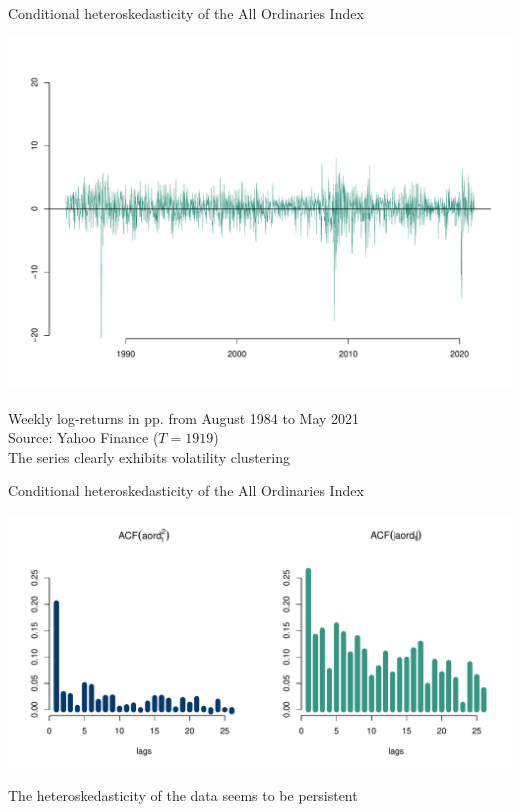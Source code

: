 \documentclass[notes,blackandwhite,mathsans,usenames,dvipsnames]{beamer}
\begin{document}
\begin{frame}{Conditional heteroskedasticity of the All Ordinaries Index}
\begin{center}
\includegraphics[scale=0.48, trim=1.5cm 2cm 0cm 3.1cm]{aord.pdf}

\bigskip\small{\color{mcxs2}Weekly log-returns in pp. from August 1984 to May 2021\\ Source: Yahoo Finance ($T=1919$)\\

\smallskip The series clearly exhibits volatility clustering}
\end{center}
\end{frame}




\begin{frame}{Conditional heteroskedasticity of the All Ordinaries Index}
\begin{center}
\includegraphics[scale=0.48, trim=1.5cm 0cm 0cm 1cm]{aord-acf.pdf}

\bigskip\small{\color{mcxs2}The heteroskedasticity of the data seems to be persistent}
\end{center}
\end{frame}
\end{document}
